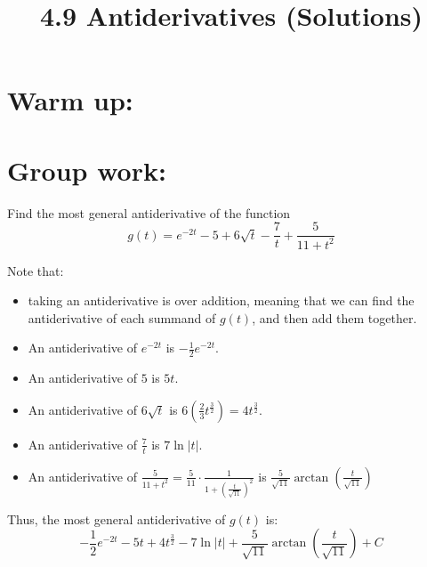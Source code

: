 \documentclass[nooutcomes]{ximera}
\title{4.9 Antiderivatives (Solutions)}
\begin{document}
\begin{abstract}		\end{abstract}
\maketitle

\section{Warm up:} 

		\begin{freeResponse}
		
		\end{freeResponse}	
		
		
		

	
	
	
	
	

\section{Group work:}



\begin{problem}
Find the most general antiderivative of the function
$$ g(t) = e^{-2t} - 5 + 6\sqrt{t}-\frac{7}{t} + \frac{5}{11 + t^2} $$
		\begin{freeResponse}
		Note that:
			\begin{itemize}
			\item  taking an antiderivative is  over addition, meaning that we can find the antiderivative of each summand of $g(t)$, and then add them together.
			\item  An antiderivative of $e^{-2t}$ is $-\frac{1}{2} e^{-2t}$.
			\item  An antiderivative of $5$ is $5t$.
			\item  An antiderivative of $6 \sqrt{t}$ is $6 \left( \frac{2}{3} t^{\frac{3}{2}} \right) = 4t^{\frac{3}{2}}$.
			\item  An antiderivative of $\frac{7}{t}$ is $7 \ln |t|$.
			\item  An antiderivative of $\frac{5}{11 + t^2} = \frac{5}{11} \cdot \frac{1}{1 + \left( \frac{t}{\sqrt{11}} \right)^2 }$
			is $\frac{5}{\sqrt{11}} \arctan \left( \frac{t}{\sqrt{11}} \right)$
			\end{itemize}
		Thus, the most general antiderivative of $g(t)$ is:
		$$ -\frac{1}{2} e^{-2t} - 5t + 4t^{\frac{3}{2}} - 7 \ln |t| + \frac{5}{\sqrt{11}} \arctan \left( \frac{t}{\sqrt{11}} \right) + C $$
		\end{freeResponse}
		
		
\end{problem}
\end{document}
